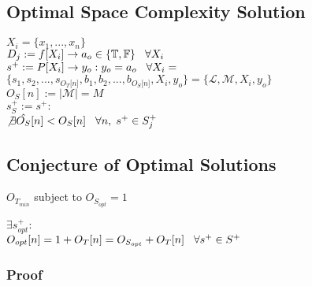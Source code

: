 \documentclass[11pt]{article}
\begin{document}
\subsection{Optimal Space Complexity Solution}

\begin{center}
$
X_i = \{x_1,...,x_n\}
$
\\ \vspace{2mm}
$
D_j := f \lbrack X_i \rbrack \rightarrow a_{o} \in \{\mathbb{T}, \mathbb{F}\} \hspace{3mm} \forall X_i
$
\\ \vspace{2mm}
$
s^+ := P \lbrack X_i \rbrack \rightarrow y_{o} : y_o = a_{o} \hspace{3mm} \forall X_i = 
$
\\ \vspace{2mm}
$
\{ s_1,s_2,...,s_{O_T \lbrack n \rbrack }, b_1, b_2,...,b_{O_S \lbrack n \rbrack},X_i,y_o \} = \{ \mathcal{L},\mathcal{M},X_i,y_o\}
$
\\ \vspace{3mm}
$
O_S[n] := |\mathcal{M}| = M
$
\\ \vspace{2mm}
$
s_{S}^+ := s^+ :
$
\\ \vspace{2mm}
$
\not \exists \hat{O_S} \lbrack n \rbrack < O_{S}[n] \hspace{3mm} \forall n, \hspace{1mm}  s^+ \in S_j^+
$
\end{center}







\subsection{Conjecture of Optimal Solutions}
$O_{T_{min}}$ subject to $O_{S_{opt}} = 1$
\begin{center}
$
\exists s^+_{opt} :
$
\\ \vspace{2mm}
$
O_{opt}[n] = 1 + O_T[n] = O_{S_{opt}} + O_T[n] \hspace{3mm} \forall s^+ \in S^+
$
\end{center}
\subsubsection{Proof}
\end{document}
